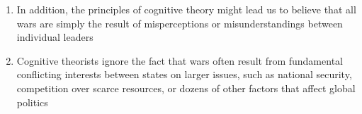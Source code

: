 \documentclass[12pt]{article}
\begin{document}
\begin{enumerate}
\begin{enumerate}
          \item In addition, the principles of cognitive theory might lead us to believe that all wars are simply the result of misperceptions or misunderstandings between individual leaders

          \item Cognitive theorists ignore the fact that wars often result from fundamental conflicting interests between states on larger issues, such as national security, competition over scarce resources, or dozens of other factors that affect global politics

        \end{enumerate}

    \end{enumerate}
\end{document}
